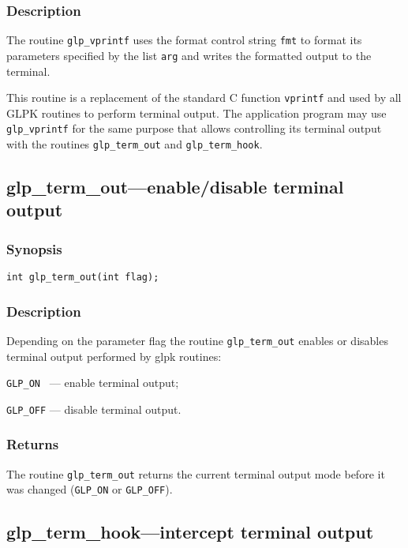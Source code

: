 \subsubsection*{Description}

The routine \verb|glp_vprintf| uses the format control string
\verb|fmt| to format its parameters specified by the list \verb|arg|
and writes the formatted output to the terminal.

This routine is a replacement of the standard C function
\verb|vprintf| and used by all GLPK routines to perform terminal
output. The application program may use \verb|glp_vprintf| for the same
purpose that allows controlling its terminal output with the routines
\verb|glp_term_out| and \verb|glp_term_hook|.

\newpage

\subsection{glp\_term\_out---enable/disable terminal output}

\subsubsection*{Synopsis}

\begin{verbatim}
int glp_term_out(int flag);
\end{verbatim}

\subsubsection*{Description}

Depending on the parameter flag the routine \verb|glp_term_out| enables
or disables terminal output performed by glpk routines:

\verb|GLP_ON | --- enable terminal output;

\verb|GLP_OFF| --- disable terminal output.

\subsubsection*{Returns}

The routine \verb|glp_term_out| returns the current terminal output
mode before it was changed (\verb|GLP_ON| or \verb|GLP_OFF|).

\subsection{glp\_term\_hook---intercept terminal output}

